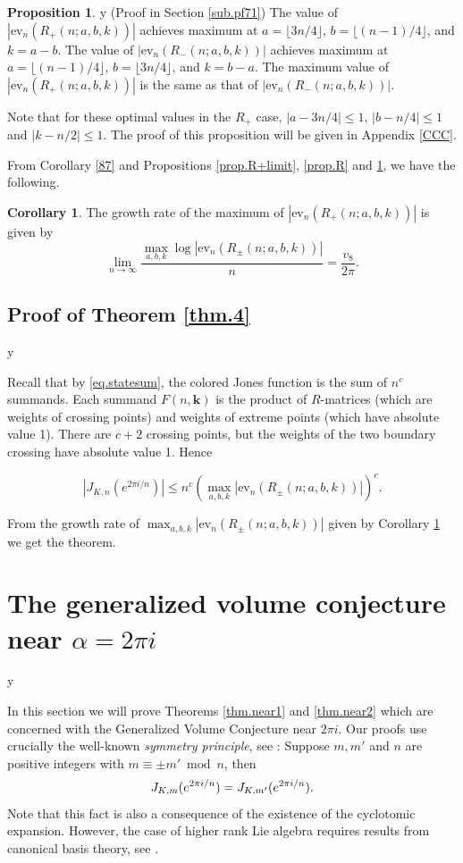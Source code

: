 \documentclass{amsart}
\theoremstyle{definition}
\newtheorem{proposition}[theorem]{Proposition}
\newtheorem{corollary}[theorem]{Corollary}
\def\printname#1{
    \if\draft y
        \smash{\makebox[0pt]{\hspace{-0.5in}
            \raisebox{8pt}{\tt\tiny #1}}}
    \fi
}
\def\lbl#1{\label{#1}\printname{#1}}
\def\a{\alpha}
\def\bk{\mathbf{k}}
\def\ev{\mathrm{ev}}
\begin{document}
\begin{proposition}
\lbl{prop.Rpm} {\rm (Proof in Section \ref{sub.pf71})}
The value of
$|\ev_n(R_+(n;a,b,k))|$ achieves maximum at $a= \lfloor 3n/4
\rfloor$, $b= \lfloor (n-1)/4 \rfloor$, and $k= a-b$. The value of
$|\ev_n(R_-(n;a,b,k))|$ achieves maximum at $a= \lfloor (n-1)/4
\rfloor$, $b= \lfloor 3n/4 \rfloor$, and $k= b-a$. The maximum
value of $|\ev_n(R_+(n;a,b,k))|$ is the same as that of
$|\ev_n(R_-(n;a,b,k))|$. %
\end{proposition}


Note that for these optimal values in the $R_+$ case, $ |a-3n/4| \le
1$, $|b-n/4| \le 1$ and $|k-n/2| \le 1$. The proof of this
proposition will be given in Appendix \ref{CCC}.

From Corollary \ref{87} and Propositions \ref{prop.R+limit},
\ref{prop.R} and \ref{prop.Rpm}, we have the following.

\begin{corollary}\label{86}
The growth rate of the maximum of
$|\ev_n(R_+(n;a,b,k))|$ is given by
$$ \lim_{n\to \infty} \frac{\max_{a, b, k} \log |\ev_n(R_\pm(n;a,b,k))| }{n}
= \frac{v_8}{2 \pi}.
$$
\end{corollary}


\subsection{Proof of Theorem \ref{thm.4}}
\lbl{sub.thm4}


Recall that by \eqref{eq.statesum}, the colored Jones function is
the sum of $n^c$ summands.   Each summand  $F(n,\bk)$ is the product
of $R$-matrices (which are weights of crossing points) and weights
of extreme points (which have absolute value 1). There are $c+2$
crossing points, but the weights of the two boundary crossing have
absolute value 1. Hence

$$
| J_{K,n}(e^{2\pi i/n})| \le n^c \left (\max_{a, b, k}
|\ev_n(R_\pm(n;a,b,k))|\right)^{c}.
$$

From the growth rate of $\max_{a, b, k} |\ev_n(R_\pm(n;a,b,k))|$
given by Corollary \ref{86} we get the theorem.


\section{The generalized volume conjecture near $\a=2\pi i$}
\lbl{sec.cyclotomic}


In this section we will prove Theorems \ref{thm.near1} and
\ref{thm.near2} which are concerned with the Generalized Volume
Conjecture near $2 \pi i$. Our proofs use crucially  the well-known
{\em symmetry principle}, see \cite{KM,Le1}: Suppose  $m, m'$ and
$n$ are positive integers with $m \equiv \pm m' \bmod n$, then
\begin{equation}
\lbl{eq.symmetryJ} J_{K,m}(e^{2 \pi i/n})=J_{K,m'}(e^{2 \pi i/n}).
\end{equation}
Note that this fact  is also a consequence of the existence of the
cyclotomic expansion. However, the case of higher rank Lie algebra
requires results from canonical basis theory, see \cite{Le1}.
\end{document}

